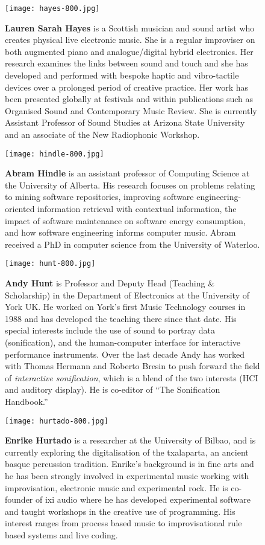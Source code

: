 \begin{authbio}
\begin{figure}[H]
  \sidecaption[t]
  \texttt{[image: hayes-800.jpg]}
  \caption{\textbf{Lauren Sarah Hayes} is a Scottish musician and sound artist who creates physical live electronic music. She is a regular improviser on both augmented piano and analogue/digital hybrid electronics. Her research examines the links between sound and touch and she has developed and performed with bespoke haptic and vibro-tactile devices over a prolonged period of creative practice. Her work has been presented globally at festivals and within publications such as Organised Sound and Contemporary Music Review. She is currently Assistant Professor of Sound Studies at Arizona State University and an associate of the New Radiophonic Workshop.}
\end{figure}

\begin{figure}[H]
  \sidecaption[t]
  \texttt{[image: hindle-800.jpg]}
  \caption{\textbf{Abram Hindle} is an assistant professor of Computing Science at the University of Alberta. His research focuses on problems relating to mining software repositories, improving software engineering-oriented information retrieval with contextual information, the impact of software maintenance on software energy consumption, and how software engineering informs computer music. Abram received a PhD in computer science from the University of Waterloo.}
\end{figure}

\begin{figure}[H]
  \sidecaption[t]
  \texttt{[image: hunt-800.jpg]}
  \caption{\textbf{Andy Hunt} is Professor and Deputy Head (Teaching \& Scholarship) in the Department of Electronics at the University of York UK. He worked on York's first Music Technology courses in 1988 and has developed the teaching there since that date. His special interests include the use of sound to portray data (sonification), and the human-computer interface for interactive performance instruments. Over the last decade Andy has worked with Thomas Hermann and Roberto Bresin to push forward the field of \emph{interactive sonification}, which is a blend of the two interests (HCI and auditory display). He is co-editor of ``The Sonification Handbook.''}
\end{figure}

\begin{figure}[H]
  \sidecaption[t]
  \texttt{[image: hurtado-800.jpg]}
  \caption{\textbf{Enrike Hurtado} is a researcher at the University of Bilbao, and is currently exploring the digitalisation of the txalaparta, an ancient basque percussion tradition. Enrike's background is in fine arts and he has been strongly involved in experimental music working with improvisation, electronic music and experimental rock. He is co-founder of ixi audio where he has developed experimental software and taught workshops in the creative use of programming. His interest ranges from process based music to improvisational rule based systems and live coding.}
\end{figure}


\end{authbio}
